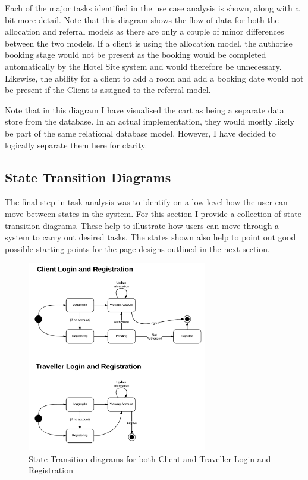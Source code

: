\documentclass{article}
\begin{document}
Each of the major tasks identified in the use case analysis is shown, along with a bit more detail. Note that this diagram shows the flow of data for both the allocation and referral models as there are only a couple of minor differences between the two models. If a client is using the allocation model, the authorise booking stage would not be present as the booking would be completed automatically by the Hotel Site system and would therefore be unnecessary. Likewise, the ability for a client to add a room and add a booking date would not be present if the Client is assigned to the referral model.

Note that in this diagram I have visualised the cart as being a separate data store from the database. In an actual implementation, they would mostly likely be part of the same relational database model. However, I have decided to logically separate them here for clarity.

\subsection{State Transition Diagrams}
The final step in task analysis was to identify on a low level how the user can move between states in the system. For this section I provide a collection of state transition diagrams. These help to illustrate how users can move through a system to carry out desired tasks. The states shown also help to point out good possible starting points for the page designs outlined in the next section.

\begin{figure}[H]
\centering
\includegraphics[width=0.7\textwidth]{img/state_diagrams/StateDiagramUserAuth.png}
\caption{State Transition diagrams for both Client and Traveller Login and Registration}
\label{fig:state-user-auth}
\end{figure}
\end{document}
